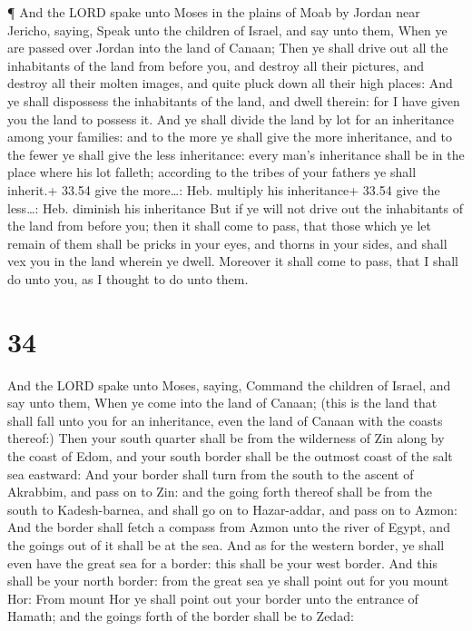  ¶ And the LORD spake unto Moses in the plains of Moab by
Jordan near Jericho, saying,  Speak unto the children of
Israel, and say unto them, When ye are passed over Jordan into the land
of Canaan;  Then ye shall drive out all the inhabitants of
the land from before you, and destroy all their pictures, and destroy
all their molten images, and quite pluck down all their high places:
 And ye shall dispossess the inhabitants of the land, and
dwell therein: for I have given you the land to possess it.
 And ye shall divide the land by lot for an inheritance
among your families: and to the more ye shall give the more inheritance,
and to the fewer ye shall give the less inheritance: every man's
inheritance shall be in the place where his lot falleth; according to
the tribes of your fathers ye shall inherit.+ 33.54 give the more\ldots:
Heb. multiply his inheritance+ 33.54 give the less\ldots: Heb. diminish
his inheritance  But if ye will not drive out the
inhabitants of the land from before you; then it shall come to pass,
that those which ye let remain of them shall be pricks in your eyes, and
thorns in your sides, and shall vex you in the land wherein ye dwell.
 Moreover it shall come to pass, that I shall do unto you,
as I thought to do unto them.

\hypertarget{section-33}{%
\section{34}\label{section-33}}

 And the LORD spake unto Moses, saying,  Command
the children of Israel, and say unto them, When ye come into the land of
Canaan; (this is the land that shall fall unto you for an inheritance,
even the land of Canaan with the coasts thereof:)  Then your
south quarter shall be from the wilderness of Zin along by the coast of
Edom, and your south border shall be the outmost coast of the salt sea
eastward:  And your border shall turn from the south to the
ascent of Akrabbim, and pass on to Zin: and the going forth thereof
shall be from the south to Kadesh-barnea, and shall go on to
Hazar-addar, and pass on to Azmon:  And the border shall
fetch a compass from Azmon unto the river of Egypt, and the goings out
of it shall be at the sea.  And as for the western border,
ye shall even have the great sea for a border: this shall be your west
border.  And this shall be your north border: from the great
sea ye shall point out for you mount Hor:  From mount Hor ye
shall point out your border unto the entrance of Hamath; and the goings
forth of the border shall be to Zedad:


